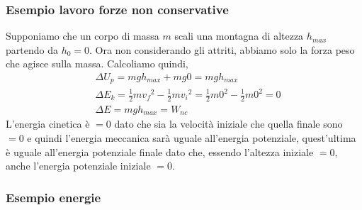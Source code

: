         \subsubsection{Esempio lavoro forze non conservative}
            Supponiamo che un corpo di massa $m$ scali una montagna di altezza $h_{max}$ partendo da $h_0=0$. Ora non considerando gli attriti, abbiamo solo la forza peso che agisce sulla massa. Calcoliamo quindi,
            \begin{align*}
                &\Delta U_p=mgh_{max}+mg0=mgh_{max}\\
                &\Delta E_k=\frac{1}{2}m{v_f}^2-\frac{1}{2}m{v_i}^2=\frac{1}{2}m0^2-\frac{1}{2}m{0}^2=0\\
                &\Delta E=mgh_{max}=W_{nc}
            \end{align*}
            L'energia cinetica è $=0$ dato che sia la velocità iniziale che quella finale sono $=0$ e quindi l'energia meccanica sarà uguale all'energia potenziale, quest'ultima è uguale all'energia potenziale finale dato che, essendo l'altezza iniziale $=0$, anche l'energia potenziale iniziale $=0$.

        \subsubsection{Esempio energie}

